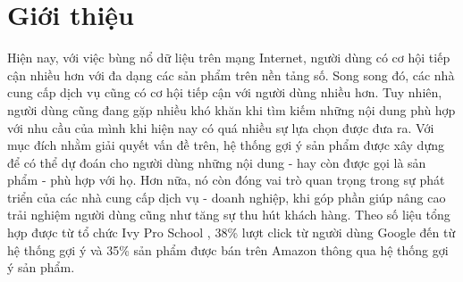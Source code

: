 \chapter{Giới thiệu}
\label{Chapter1}
\graphicspath{{Chapter1/Chapter1Figs}}
\justifying

\setlength{\parindent}{6.5ex}





Hiện nay, với việc bùng nổ dữ liệu trên mạng Internet, người dùng có cơ hội tiếp cận
nhiều hơn với đa dạng các sản phẩm trên nền tảng số. Song song đó,
các nhà cung cấp dịch vụ cũng có cơ hội tiếp cận với người dùng nhiều hơn. %
Tuy nhiên, người dùng cũng đang gặp nhiều khó khăn khi tìm kiếm những nội dung phù hợp với nhu cầu của mình khi hiện nay có quá nhiều sự lựa chọn được đưa ra.
Với mục đích nhằm giải quyết vấn đề trên, hệ thống gợi ý sản phẩm được xây dựng để có thể dự đoán cho người dùng những nội dung - hay còn được gọi là sản phẩm - phù hợp với họ.
Hơn nữa, nó còn đóng vai trò quan trọng trong sự phát triển của các nhà cung cấp dịch vụ - doanh nghiệp,
khi góp phần giúp nâng cao trải nghiệm người dùng cũng như tăng sự thu hút khách hàng. Theo số liệu tổng hợp được từ tổ chức Ivy Pro School \cite{ivy}, 
38\% lượt click từ người dùng Google đến từ hệ thống gợi ý và 35\% sản phẩm được bán trên Amazon thông qua hệ thống gợi ý sản phẩm.

